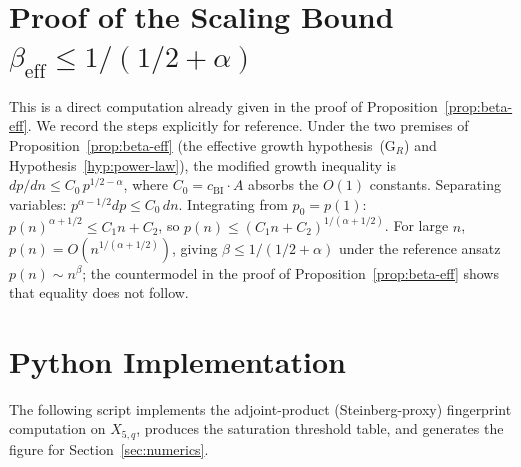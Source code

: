 \documentclass[11pt]{article}
\theoremstyle{definition}
\theoremstyle{remark}
\newcommand{\beff}{\beta_{\mathrm{eff}}}
\begin{document}
  \section{Proof of the Scaling Bound \texorpdfstring{$\beff \leq 1/(1/2 + \alpha)$}{beta\_eff <= 1/(1/2 + alpha)}}
  \label{app:proof}

  This is a direct computation already given in the proof of Proposition~\ref{prop:beta-eff}.
  We record the steps explicitly for reference.
  Under the two premises of Proposition~\ref{prop:beta-eff} (the effective growth
  hypothesis~(G$_R$) and Hypothesis~\ref{hyp:power-law}), the modified growth inequality is
  $dp/dn \leq C_0 \, p^{1/2 - \alpha}$,
  where $C_0 = c_{\mathrm{BI}} \cdot A$ absorbs the $O(1)$ constants.
  Separating variables: $p^{\alpha - 1/2} dp \leq C_0 \, dn$.
  Integrating from $p_0 = p(1)$:
  $p(n)^{\alpha + 1/2} \leq C_1 n + C_2$,
  so $p(n) \leq (C_1 n + C_2)^{1/(\alpha + 1/2)}$.
  For large $n$, $p(n) = O(n^{1/(\alpha+1/2)})$, giving $\beta \leq 1/(1/2 + \alpha)$ under the reference
  ansatz $p(n) \sim n^\beta$; the countermodel in the proof of Proposition~\ref{prop:beta-eff} shows
  that equality does not follow.

  \section{Python Implementation}
  \label{app:python}

  The following script implements the adjoint-product (Steinberg-proxy) fingerprint
  computation on $X_{5,q}$, produces the saturation threshold table, and generates
  the figure for Section~\ref{sec:numerics}.
\end{document}
